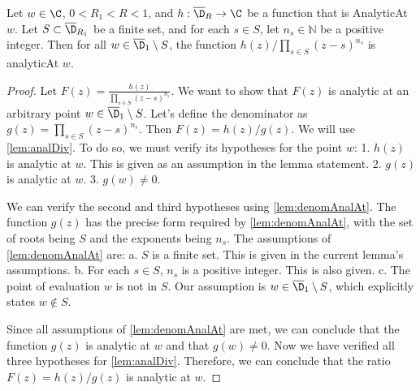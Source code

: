 \begin{lemma}\label{lem:ratioAnalAt} \leanok {}
Let $w\in\C$, $0<R_1<R<1$, and $h:\overline{\D}_R\to\C$ be a function that is AnalyticAt $w$. Let $S \subset \overline{\D}_{R_1}$ be a finite set, and for each $s \in S$, let $n_s \in \mathbb{N}$ be a positive integer. Then for all $w\in \overline{\D}_1\setminus S$, the function $h(z)/\prod_{s \in S} (z-s)^{n_s}$ is analyticAt $w$.
\end{lemma}
\begin{proof}
\leanok
Let $F(z) = \frac{h(z)}{\prod_{s \in S} (z-s)^{n_s}}$. We want to show that $F(z)$ is analytic at an arbitrary point $w \in \overline{\D}_1 \setminus S$.
Let's define the denominator as $g(z) = \prod_{s \in S} (z-s)^{n_s}$. Then $F(z) = h(z)/g(z)$.
We will use \cref{lem:analDiv}. To do so, we must verify its hypotheses for the point $w$:
1.  $h(z)$ is analytic at $w$. This is given as an assumption in the lemma statement.
2.  $g(z)$ is analytic at $w$.
3.  $g(w) \neq 0$.

We can verify the second and third hypotheses using \cref{lem:denomAnalAt}. The function $g(z)$ has the precise form required by \cref{lem:denomAnalAt}, with the set of roots being $S$ and the exponents being $n_s$.
The assumptions of \cref{lem:denomAnalAt} are:
a. $S$ is a finite set. This is given in the current lemma's assumptions.
b. For each $s \in S$, $n_s$ is a positive integer. This is also given.
c. The point of evaluation $w$ is not in $S$. Our assumption is $w \in \overline{\D}_1 \setminus S$, which explicitly states $w \notin S$.

Since all assumptions of \cref{lem:denomAnalAt} are met, we can conclude that the function $g(z)$ is analytic at $w$ and that $g(w) \neq 0$.
Now we have verified all three hypotheses for \cref{lem:analDiv}. Therefore, we can conclude that the ratio $F(z) = h(z)/g(z)$ is analytic at $w$.
\end{proof}

